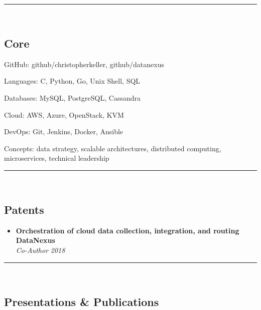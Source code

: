 

\hrule\
\vspace{-0.4em}
\subsection*{Core}
\begin{indentsection}{\parindent}
    \begin{description*}
        \item[GitHub:] github/christopherkeller, github/datanexus
        \item[Languages:] C, Python, Go, Unix Shell, \textsc{SQL}
        \item[Databases:] My\textsc{SQL}, Postgre\textsc{SQL}, Cassandra
        \item[Cloud:] AWS, Azure, OpenStack, KVM 
        \item[DevOps:] Git, Jenkins, Docker, Ansible
        \item[Concepts:] data strategy, scalable architectures, distributed computing, microservices, technical leadership
	\end{description*}
\end{indentsection}
\hrule\
\vspace{-0.4em}

\subsection*{Patents}

\begin{itemize}
    \parskip=0.1em
    \item
    \headerrow
        {\textbf{Orchestration of cloud data collection, integration, and routing}}
        {\textbf{DataNexus}}
    \\
    \headerrow
        {\emph{Co-Author}}
        {\emph{2018}}
\end{itemize}


\hrule\
\vspace{-0.4em}

\subsection*{Presentations \& Publications}

